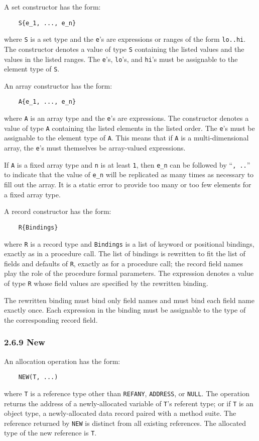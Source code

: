 \documentclass[10pt]{article}
\begin{document}
A set constructor has the form:
\begin{verbatim}
    S{e_1, ..., e_n}
\end{verbatim}
where \verb|S| is a set type and the \verb|e|'s are expressions or ranges of
the form \verb|lo..hi|.  The constructor denotes a value of type \verb|S|
containing the listed values and the values in the listed ranges.  The
\verb|e|'s, \verb|lo|'s, and \verb|hi|'s must be assignable to the element
type of \verb|S|.

An array constructor has the form:
\begin{verbatim}
    A{e_1, ..., e_n}
\end{verbatim}
where \verb|A| is an array type and the \verb|e|'s are expressions.  The
constructor denotes a value of type \verb|A| containing the listed elements in
the listed order.  The \verb|e|'s must be assignable to the element type of
\verb|A|.  This means that if \verb|A| is a multi-dimensional array, the
\verb|e|'s must themselves be array-valued expressions.

If \verb|A| is a fixed array type and \verb|n| is at least \verb|1|, then
\verb|e_n| can be followed by ``\verb|, ..|'' to indicate that the value of
\verb|e_n| will be replicated as many times as necessary to fill out the
array.  It is a static error to provide too many or too few elements for a
fixed array type.

A record constructor has the form:
\begin{verbatim}
    R{Bindings}
\end{verbatim}
where \verb|R| is a record type and \verb|Bindings| is a list of keyword or
positional bindings, exactly as in a procedure call.  The list of bindings is
rewritten to fit the list of fields and defaults of \verb|R|, exactly as for a
procedure call; the record field names play the role of the procedure formal
parameters.  The expression denotes a value of type \verb|R| whose field
values are specified by the rewritten binding.

The rewritten binding must bind only field names and must bind each field name
exactly once.  Each expression in the binding must be assignable to the type
of the corresponding record field.

\subsubsection*{2.6.9 New}

An allocation operation has the form:
\begin{verbatim}
    NEW(T, ...)
\end{verbatim}
where \verb|T| is a reference type other than \verb|REFANY|, \verb|ADDRESS|,
or \verb|NULL|.  The operation returns the address of a newly-allocated
variable of \verb|T|'s referent type; or if \verb|T| is an object type, a
newly-allocated data record paired with a method suite.  The reference
returned by \verb|NEW| is distinct from all existing references.  The
allocated type of the new reference is \verb|T|.
\end{document}
